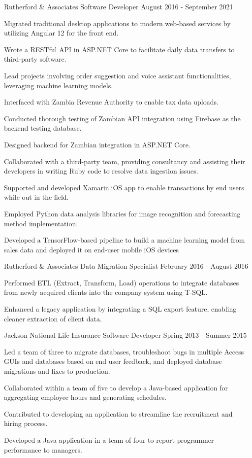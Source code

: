 \documentclass{marvinkassabian_resume}
\begin{document}
\subsectionpositiondate
{Rutherford \& Associates}
{Software Developer}
{August 2016 - September 2021}
\resumesublistbegin
\item Migrated traditional desktop applications to modern web-based services by utilizing Angular 12 for the front end.
\item Wrote a RESTful API in ASP.NET Core to facilitate daily data transfers to third-party software.
\item Lead projects involving order suggestion and voice assistant functionalities, leveraging machine learning models.
\item Interfaced with Zambia Revenue Authority to enable tax data uploads.
\item Conducted thorough testing of Zambian API integration using Firebase as the backend testing database.
\item Designed backend for Zambian integration in ASP.NET Core.
\item Collaborated with a third-party team, providing consultancy and assisting their developers in writing Ruby code to resolve data ingestion issues.
\item Supported and developed Xamarin.iOS app to enable transactions by end users while out in the field.
\item Employed Python data analysis libraries for image recognition and forecasting method implementation.
\item Developed a TensorFlow-based pipeline to build a machine learning model from sales data and deployed it on end-user mobile iOS devices
\resumesublistend

\subsectionpositiondate
{Rutherford \& Associates}
{Data Migration Specialist}
{February 2016 - August 2016}
\resumesublistbegin
\item Performed ETL (Extract, Transform, Load) operations to integrate databases from newly acquired clients into the company system using T-SQL.
\item Enhanced a legacy \cpp application by integrating a SQL export feature, enabling cleaner extraction of client data.
\resumesublistend

\subsectionpositiondate
{Jackson National Life Insurance}
{Software Developer}
{Spring 2013 - Summer 2015}
\resumesublistbegin
\item Led a team of three to migrate databases, troubleshoot bugs in multiple Access GUIs and databases based on end user feedback, and deployed database migrations and fixes to production.
\item Collaborated within a team of five to develop a Java-based application for aggregating employee hours and generating schedules.
\item Contributed to developing an application to streamline the recruitment and hiring process.
\item Developed a Java application in a team of four to report programmer performance to managers.
\resumesublistend
\end{document}
